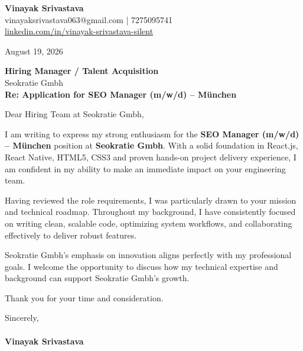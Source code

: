 \documentclass[11pt,a4paper]{article}
\begin{document}
\thispagestyle{empty}

{\Large \textbf{Vinayak Srivastava}}\\
vinayaksrivastava063@gmail.com | 7275095741 \\
\url{linkedin.com/in/vinayak-srivastava-silent}

\vspace{1em}
\hfill August 19, 2026

\textbf{Hiring Manager / Talent Acquisition}\\
Seokratie Gmbh\\

\vspace{1.5em}
\textbf{Re: Application for SEO Manager (m/w/d) – München}

\vspace{1em}
Dear Hiring Team at Seokratie Gmbh,

I am writing to express my strong enthusiasm for the \textbf{SEO Manager (m/w/d) – München} position at \textbf{Seokratie Gmbh}. With a solid foundation in React.js, React Native, HTML5, CSS3 and proven hands-on project delivery experience, I am confident in my ability to make an immediate impact on your engineering team.

Having reviewed the role requirements, I was particularly drawn to your mission and technical roadmap. Throughout my background, I have consistently focused on writing clean, scalable code, optimizing system workflows, and collaborating effectively to deliver robust features.

Seokratie Gmbh's emphasis on innovation aligns perfectly with my professional goals. I welcome the opportunity to discuss how my technical expertise and background can support Seokratie Gmbh's growth.

Thank you for your time and consideration.

\vspace{1.5em}
Sincerely,\\
\vspace{1em}\\
\textbf{Vinayak Srivastava}
\end{document}
